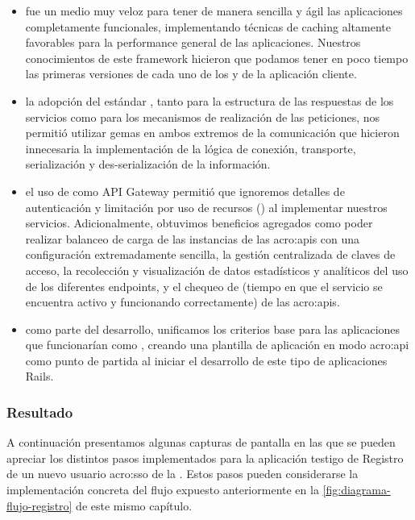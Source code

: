 \begin{itemize}
  \item {} fue un medio muy veloz para tener de manera sencilla y ágil las aplicaciones completamente funcionales, implementando técnicas de caching altamente favorables para la performance general de las aplicaciones. Nuestros conocimientos de este framework hicieron que podamos tener en poco tiempo las primeras versiones de cada uno de los  y de la aplicación cliente.

  \item la adopción del estándar , tanto para la estructura de las respuestas de los servicios como para los mecanismos de realización de las peticiones, nos permitió utilizar gemas en ambos extremos de la comunicación que hicieron innecesaria la implementación de la lógica de conexión, transporte, serialización y des-serialización de la información.

  \item el uso de  como API Gateway permitió que ignoremos detalles de autenticación y limitación por uso de recursos () al implementar nuestros servicios. Adicionalmente, obtuvimos beneficios agregados como poder realizar balanceo de carga de las instancias de las \glspl{acro:api} con una configuración extremadamente sencilla, la gestión centralizada de claves de acceso, la recolección y visualización de datos estadísticos y analíticos del uso de los diferentes endpoints, y el chequeo de  (tiempo en que el servicio se encuentra activo y funcionando correctamente) de las \glspl{acro:api}.

  \item como parte del desarrollo, unificamos los criterios base para las aplicaciones que funcionarían como , creando una plantilla de aplicación en modo \gls{acro:api} como punto de partida al iniciar el desarrollo de este tipo de aplicaciones Rails.
\end{itemize}

\subsubsection{Resultado}

A continuación presentamos algunas capturas de pantalla en las que se pueden apreciar los distintos pasos implementados para la aplicación testigo de Registro de un nuevo usuario \gls{acro:sso} de la {\unlp}. Estos pasos pueden considerarse la implementación concreta del flujo expuesto anteriormente en la \autoref{fig:diagrama-flujo-registro} de este mismo capítulo.

